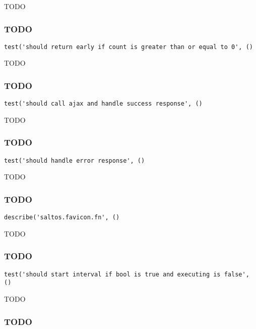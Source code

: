 \documentclass[a4paper]{article}
\begin{document}
TODO

\hypertarget{toc689}{}
\subsubsection{TODO}

\begin{lstlisting}
test('should return early if count is greater than or equal to 0', ()
\end{lstlisting}

TODO

\hypertarget{toc690}{}
\subsubsection{TODO}

\begin{lstlisting}
test('should call ajax and handle success response', ()
\end{lstlisting}

TODO

\hypertarget{toc691}{}
\subsubsection{TODO}

\begin{lstlisting}
test('should handle error response', ()
\end{lstlisting}

TODO

\hypertarget{toc692}{}
\subsubsection{TODO}

\begin{lstlisting}
describe('saltos.favicon.fn', ()
\end{lstlisting}

TODO

\hypertarget{toc693}{}
\subsubsection{TODO}

\begin{lstlisting}
test('should start interval if bool is true and executing is false', ()
\end{lstlisting}

TODO

\hypertarget{toc694}{}
\subsubsection{TODO}
\end{document}
